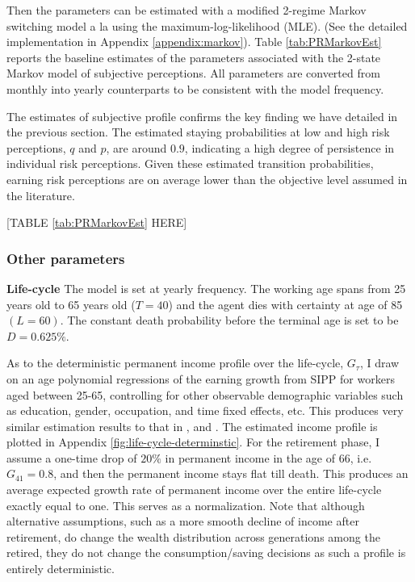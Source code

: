 Then the parameters can be estimated with a modified 2-regime Markov switching model a la \cite{hamilton1989new} using the maximum-log-likelihood (MLE). (See the detailed implementation in Appendix \ref{appendix:markov}). Table \ref{tab:PRMarkovEst}  reports the baseline estimates of the parameters associated with the 2-state Markov model of subjective perceptions. All parameters are converted from monthly into yearly counterparts to be consistent with the model frequency. 

The estimates of subjective profile confirms the key finding we have detailed in the previous section. The estimated staying probabilities at low and high risk perceptions, $q$ and $p$, are around $0.9$, indicating a high degree of persistence in individual risk perceptions. Given these estimated transition probabilities, earning risk perceptions are on average lower than the objective level assumed in the literature.  


\begin{center}
[TABLE \ref{tab:PRMarkovEst} HERE]
\end{center}

\subsubsection{Other parameters}


\textbf{Life-cycle} The model is set at yearly frequency. The working age spans from 25 years old to 65 years old ($T=40$) and the agent dies with certainty at age of 85 $(L=60)$. The constant death probability before the terminal age is set to be $D=0.625\%$. 


As to the deterministic permanent income profile over the life-cycle, $G_\tau$, I draw on an age polynomial regressions of the earning growth from SIPP for workers aged between 25-65, controlling
for other observable demographic variables such as education, gender, occupation, and time fixed effects, etc. This produces very similar estimation results to that in \cite{gourinchas2002consumption}, \cite{cagetti2003wealth} and \cite{kaplan2014model}. The estimated income profile is plotted in Appendix \ref{fig:life-cycle-determinstic}. For the retirement phase, I assume a one-time drop of $20\%$ in permanent income in the age of $66$, i.e. $G_{41}=0.8$, and then the permanent income stays flat till death. This produces an average expected growth rate of permanent income over the entire life-cycle exactly equal to one. This serves as a normalization. Note that although alternative assumptions, such as a more smooth decline of income after retirement, do change the wealth distribution across generations among the retired, they do not change the consumption/saving decisions as such a profile is entirely deterministic. 

